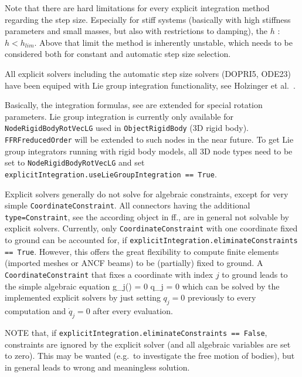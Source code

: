 Note that there are hard limitations for every explicit integration method regarding the step size. Especially for stiff systems (basically with high stiffness parameters and small masses, but also with restrictions to damping), the  $h$ : $h < h_{lim}$. Above that limit the method is inherently unstable, which needs to be considered both for constant and automatic step size selection.

All explicit solvers including the automatic step size solvers (DOPRI5, ODE23) have been equiped with Lie group integration functionality, see Holzinger et al.\ \cite{HolzingerArnoldGerst2023}.

Basically, the integration formulas, see  are extended for special rotation parameters.
Lie group integration is currently only available for \texttt{NodeRigidBodyRotVecLG} used in \texttt{ObjectRigidBody} (3D rigid body). 
\texttt{FFRFreducedOrder} will be extended to such nodes in the near future.
To get Lie group integrators running with rigid body models, all 3D node types need to be set to \texttt{NodeRigidBodyRotVecLG} and 
set \texttt{explicitIntegration.useLieGroupIntegration == True}.

Explicit solvers generally do not solve for algebraic constraints, except for very simple \texttt{CoordinateConstraint}. 
All connectors having the additional \texttt{type=Constraint}, see the according object in ff., 
are in general not solvable by explicit solvers. 
Currently, only \texttt{CoordinateConstraint} with one coordinate fixed to ground can be accounted for, 
if \texttt{explicitIntegration.eliminateConstraints == True}. 
However, this offers the great flexibility to compute finite elements (imported meshes or ANCF beams) to be (partially) fixed to ground.
A \texttt{CoordinateConstraint} that fixes a coordinate with index $j$ to ground leads to the simple algebraic  equation
\be
  g_j(\qv) = 0 \quad \Leftrightarrow \quad  q_j = 0
\ee
which can be solved by the implemented explicit solvers by just setting $q_j = 0$ previously to every computation and $\dot q_j = 0$ after every  evaluation.

NOTE that, if \texttt{explicitIntegration.eliminateConstraints == False}, constraints are ignored by the explicit solver (and all algebraic variables are set to zero). This may be wanted (e.g.\ to investigate the free motion of bodies), but in general leads to wrong and meaningless solution.

